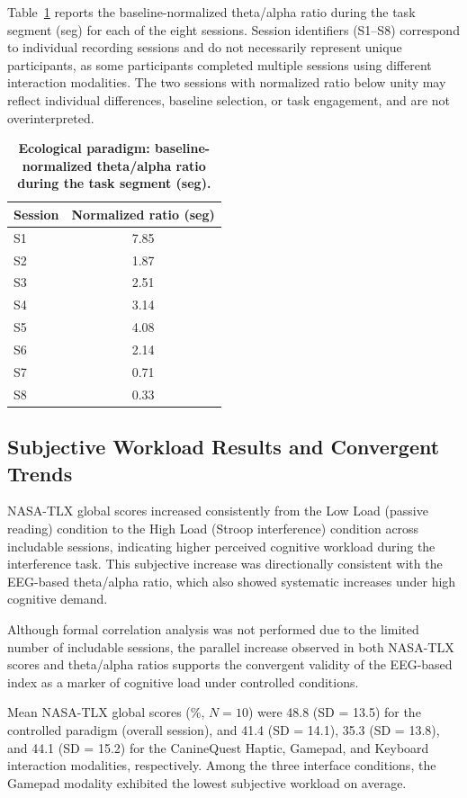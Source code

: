 \documentclass[letterpaper, 10 pt, conference]{ieeeconf}
\begin{document}
Table~\ref{tab:eco} reports the baseline-normalized theta/alpha ratio during the task segment (seg) for each of the eight sessions. Session identifiers (S1--S8) correspond to individual recording sessions and do not necessarily represent unique participants, as some participants completed multiple sessions using different interaction modalities. The two sessions with normalized ratio below unity may reflect individual differences, baseline selection, or task engagement, and are not overinterpreted.
\begin{table}[H]
\centering
\caption{\textbf{Ecological paradigm: baseline-normalized theta/alpha ratio during the task segment (seg).}}
\label{tab:eco}
\footnotesize
\setlength{\tabcolsep}{6pt}
\begin{tabular}{lc}
\toprule
\textbf{Session} & \textbf{Normalized ratio (seg)} \\
\midrule
S1 & 7.85 \\
S2 & 1.87 \\
S3 & 2.51 \\
S4 & 3.14 \\
S5 & 4.08 \\
S6 & 2.14 \\
S7 & 0.71 \\
S8 & 0.33 \\
\bottomrule
\end{tabular}
\end{table}

\subsection{Subjective Workload Results and Convergent Trends}

NASA-TLX global scores increased consistently from the Low Load (passive reading) condition to the High Load (Stroop interference) condition across includable sessions, indicating higher perceived cognitive workload during the interference task. This subjective increase was directionally consistent with the EEG-based theta/alpha ratio, which also showed systematic increases under high cognitive demand.

Although formal correlation analysis was not performed due to the limited number of includable sessions, the parallel increase observed in both NASA-TLX scores and theta/alpha ratios supports the convergent validity of the EEG-based index as a marker of cognitive load under controlled conditions.

Mean NASA-TLX global scores (\%, $N=10$) were 48.8 (SD = 13.5) for the controlled paradigm (overall session), and 41.4 (SD = 14.1), 35.3 (SD = 13.8), and 44.1 (SD = 15.2) for the CanineQuest Haptic, Gamepad, and Keyboard interaction modalities, respectively. Among the three interface conditions, the Gamepad modality exhibited the lowest subjective workload on average.
\end{document}
